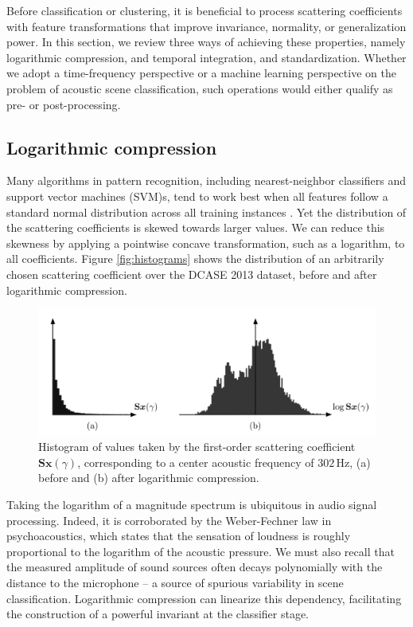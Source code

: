 \documentclass[journal]{IEEEtran}
\begin{document}
Before classification or clustering, it is beneficial to process scattering coefficients with feature transformations that improve invariance, normality, or generalization power.
In this section, we review three ways of achieving these properties, namely logarithmic compression, and temporal integration, and standardization.
Whether we adopt a time-frequency perspective or a machine learning perspective on the problem of acoustic scene classification, such operations would either qualify as pre- or post-processing.

\subsection{Logarithmic compression}
\label{sec:logcomp}

Many algorithms in pattern recognition, including nearest-neighbor classifiers and support vector machines (SVM)s, tend to work best when all features follow a standard normal distribution across all training instances \cite{Hsu2003}.
Yet the distribution of the scattering coefficients is skewed towards larger values. We can reduce this skewness by applying a pointwise concave transformation, such as a logarithm, to all coefficients.
Figure \ref{fig:histograms} shows the distribution of an arbitrarily chosen scattering coefficient over the DCASE 2013 dataset, before and after logarithmic compression.

\begin{figure}
\begin{center}
\includegraphics[width=\columnwidth]{bw/compression}
\caption{
\label{fig:histograms}
Histogram of values taken by the first-order scattering coefficient $\mathbf{S}\boldsymbol{x}(\gamma)$, corresponding to a center acoustic frequency of $302\,\mathrm{Hz}$,
(a) before and (b) after logarithmic compression.}
\label{fig:compression}
\end{center}
\end{figure}


Taking the logarithm of a magnitude spectrum is ubiquitous in audio signal processing.
Indeed, it is corroborated by the Weber-Fechner law in psychoacoustics, which states that the sensation of loudness is roughly proportional to the logarithm of the acoustic pressure. 
We must also recall that the measured amplitude of sound sources often decays polynomially with the distance to the microphone -- a source of spurious variability in scene classification.
Logarithmic compression can linearize this dependency, facilitating the construction of a powerful invariant at the classifier stage.
\end{document}
